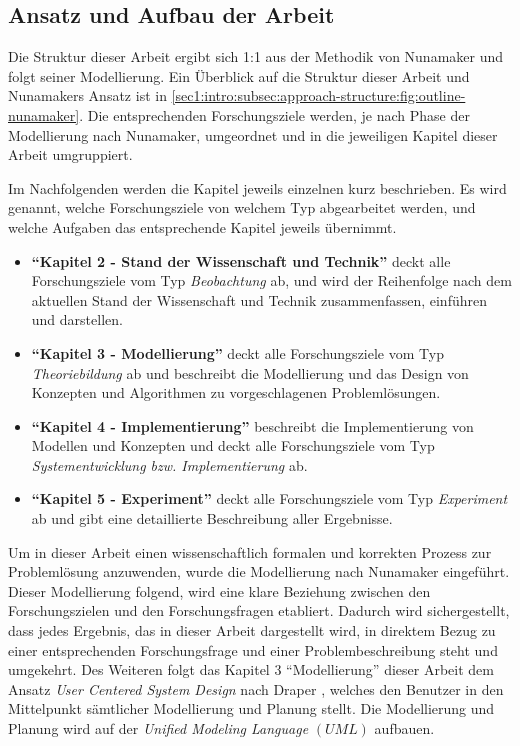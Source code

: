 \subsection{Ansatz und Aufbau der Arbeit}
\label{sec1:intro:subsec:approach-structure}
Die Struktur dieser Arbeit ergibt sich 1:1 aus der Methodik von Nunamaker \cite{nunamaker} und folgt seiner Modellierung.
Ein Überblick auf die Struktur dieser Arbeit und Nunamakers Ansatz ist in \cref{sec1:intro:subsec:approach-structure:fig:outline-nunamaker}.
Die entsprechenden Forschungsziele werden, je nach Phase der Modellierung nach Nunamaker, umgeordnet und in die jeweiligen Kapitel dieser Arbeit umgruppiert.
\clearpage


Im Nachfolgenden werden die Kapitel jeweils einzelnen kurz beschrieben. Es wird genannt, welche Forschungsziele von welchem Typ abgearbeitet werden, und welche Aufgaben das entsprechende Kapitel jeweils übernimmt.
\begin{itemize}
    \setlength{\itemsep}{0pt}
    \item \textbf{\enquote{Kapitel 2 - Stand der Wissenschaft und Technik}} deckt alle Forschungsziele vom Typ \textit{Beobachtung} ab, und wird der Reihenfolge nach dem aktuellen Stand der Wissenschaft und Technik zusammenfassen, einführen und darstellen.
    \item \textbf{\enquote{Kapitel 3 - Modellierung}} deckt alle Forschungsziele vom Typ \textit{Theoriebildung} ab und beschreibt die Modellierung und das Design von Konzepten und Algorithmen zu vorgeschlagenen Problemlösungen.
    \item \textbf{\enquote{Kapitel 4 - Implementierung}} beschreibt die Implementierung von Modellen und Konzepten und deckt alle Forschungsziele vom Typ \textit{Systementwicklung bzw. Implementierung} ab.
    \item \textbf{\enquote{Kapitel 5 - Experiment}} deckt alle Forschungsziele vom Typ \textit{Experiment} ab und gibt eine detaillierte Beschreibung aller Ergebnisse.
\end{itemize}
\noindent
Um in dieser Arbeit einen wissenschaftlich formalen und korrekten Prozess zur Problemlösung anzuwenden, wurde die Modellierung nach Nunamaker eingeführt.
Dieser Modellierung folgend, wird eine klare Beziehung zwischen den Forschungszielen und den Forschungsfragen etabliert.
Dadurch wird sichergestellt, dass jedes Ergebnis, das in dieser Arbeit dargestellt wird, in direktem Bezug zu einer entsprechenden Forschungsfrage und einer Problembeschreibung steht und umgekehrt.
Des Weiteren folgt das Kapitel 3 \enquote{Modellierung} dieser Arbeit dem Ansatz \textit{User Centered System Design} nach Draper \cite{norman-draper-user-centered-system-design}, welches den Benutzer in den Mittelpunkt sämtlicher Modellierung und Planung stellt.
Die Modellierung und Planung wird auf der \textit{Unified Modeling Language} $(UML)$ \cite{uml} aufbauen.

